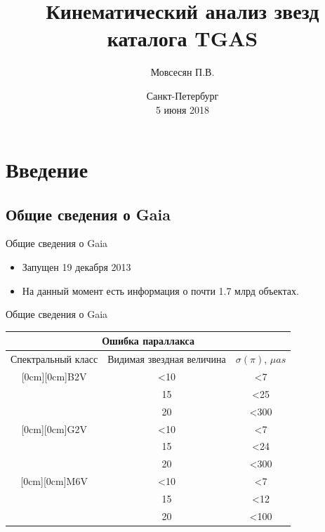 \documentclass{beamer}
\title{Кинематический анализ звезд каталога TGAS}
\author{Мовсесян П.В.}
\date{Санкт-Петербург \\ 
5 июня 2018}
\institute[СПбГУ]{Санкт-Петербургский Государственный Университет\\ 
\vspace{0.4cm} 
Научный руководитель: Цветков А.С. \\ 
Рецензент: Малкин З.М.\\ 
}
\begin{document}
\begin{frame}
  \titlepage
\end{frame}



\section{Введение}

\subsection{Общие сведения о Gaia}

\begin{frame}{Общие сведения о Gaia}
\begin{itemize}
\item Запущен 19 декабря 2013
\item На данный момент есть информация о почти 1.7 млрд объектах.
\end{itemize}
\end{frame}

\begin{frame}{Общие сведения о Gaia}
\center\begin{tabular}{|c|c|c|}
\hline
\multicolumn{3}{|c|}{Ошибка параллакса}\\
\hline
Спектральный класс & Видимая звездная величина & $\sigma(\pi)$, $\mu as$\\
\hline
\raisebox{-4ex}[0cm][0cm]{B2V} &<10 &<7\\
\cline{2-3}
& 15 & <25\\
\cline{2-3}
& 20 & <300\\
\hline
\raisebox{-4ex}[0cm][0cm]{G2V} &<10 &<7\\
\cline{2-3}
& 15 & <24\\
\cline{2-3}
&20 & <300\\
\hline
\raisebox{-4ex}[0cm][0cm]{M6V} &<10 &<7\\
\cline{2-3}
& 15 & <12\\
\cline{2-3}
&20 & <100\\
\hline
\end{tabular}\\
\end{frame}
\end{document}
